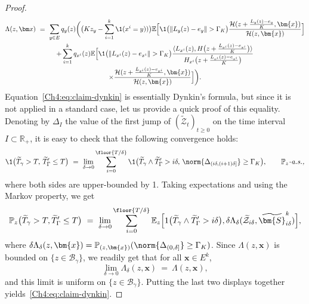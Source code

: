\begin{refsegment}
\begin{proof}
    \begin{multline}\label{Ch4:eq:intensity_jump_PP}
\Lambda(z, \bm x)\ =\ \sum_{y\in E} q_y(z) \bigg(\big(K z_y-\sum_{i=1}^k \1(x^i= y))\big)
                \mathbb{E}\Big[\1\big(\lVert L_y(z)-e_y\rVert > \Gamma_K \big) \frac{\mathcal{H}(z+\frac{L_y(z)-e_y}{K}, \bm{x} )}{\mathcal{H}(z, \bm{x})}\Big]  \\
                + \sum_{i=1}^k q_{x^i}(z)  \mathbb{E}\Big[\1\big(\lVert L_{x^i}(z)-e_{x^i} \rVert > \Gamma_K\big)\frac{\langle L_{x^i}(z), H\big(z + \frac{L_{x^i}(z)-e_{x^i}}{K}\big)\rangle }{H_{x^i}\big(z + \frac{L_{x^i}(z)-e_{x^i}}{K}\big)} 
              \\
                \times \frac{\mathcal{H}(z+\frac{L_{x^i}(z)-e_{x^i}}{K}, \bm{x})}{\mathcal{H}(z, \bm{x})} \Big] \bigg).
    \end{multline}
    Equation~\eqref{Ch4:eq:claim-dynkin} is essentially Dynkin's formula, but since it is not applied in a standard case, let us provide a quick proof of this equality.
    Denoting by $\Delta_{I}$ the value of the first jump of $(\widetilde{\mathcal{Z}}_t)_{t\geq 0}$ on the time interval $I\subset \mathbb{R}_+$, it is easy to check that the following convergence holds:
    \[
        \1\big( \widetilde{T}_\gamma > T,\, \widetilde{T}'_\Gamma \leq T \big)\ =\ \lim_{\delta \to 0} \sum_{i=0}^{\floor{T/\delta}} \1\big( \widetilde{T}_\gamma\wedge \widetilde{T}'_\Gamma > i\delta,\, \norm{\Delta_{(i\delta, (i+1)\delta]}} \geq \Gamma_K \big), \qquad \mathbb{P}_{z}\textit{-a.s.,}
    \]
    where both sides are upper-bounded by 1. Taking expectations and using the Markov property, we get
    \[
        \mathbb{P}_{z}\big( \widetilde{T}_\gamma > T, \widetilde{T}'_\Gamma \leq T \big)\ =\ \lim_{\delta \to 0} \sum_{i=0}^{\floor{T/\delta}} \mathbb{E}_{z}\Big[1\big( \widetilde{T}_\gamma \wedge \widetilde{T}'_\Gamma > i\delta \big), \delta \Lambda_\delta(\widetilde{\mathcal{Z}}_{i\delta}, \widetilde{\bm{S}}^k_{i\delta}) \Big],
    \]
    where $\delta \Lambda_\delta(z, \bm{x}) = \mathbb{P}_{(z, \bm{x})}(\norm{\Delta_{(0, \delta]}} \geq \Gamma_K )$.
    Since $\Lambda(z, \bm{x})$ is bounded on $\{z\in \mathscr{B}_\gamma\}$, we readily get that for all $\bm x\in E^k$,
    \[
        \lim_{\delta\to 0} \Lambda_\delta(z, \bm{x})\ =\ \Lambda(z, \bm{x}),
    \]
    and this limit is uniform on $\{z\in \mathscr{B}_\gamma\}$. Putting the last two displays together yields~\eqref{Ch4:eq:claim-dynkin}.
    

\end{proof}
\end{refsegment}
